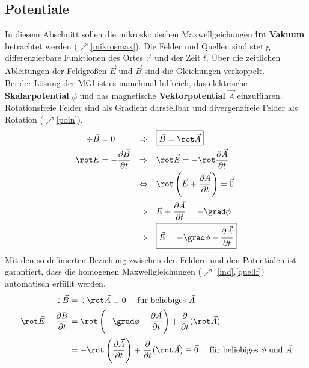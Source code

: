 \subsection{Potentiale} 
In diesem Abschnitt sollen die mikroskopischen Maxwellgeichungen \textbf{im Vakuum} betrachtet werden ($\nearrow$\ref{mikrosmax}). Die Felder und Quellen sind stetig differenzierbare Funktionen des Ortes $\vec{{r}}$ und der Zeit ${t}$. Über die zeitlichen Ableitungen der Feldgrößen $\vec{E}$ und $\vec{B}$ sind die Gleichungen verkoppelt.\\
Bei der Lösung der MGl ist es manchmal hilfreich, das elektrische \textbf{Skalarpotential} $\phi$ und das magnetische \textbf{Vektorpotential} $\vec{A}$ einzuführen. Rotationsfreie Felder sind als Gradient darstellbar und divergenzfreie Felder als Rotation ($\nearrow$\ref{poin}).
 \begin{align}
	\div \vec{B} & = 0                                     & \Rightarrow \quad    & \boxed{\vec{B} =\rot  \vec{A}}                                        \label{potadef}   \\
	\rot \vec{E} & = -\frac{\partial \vec{B} }{\partial t} & \Rightarrow  \quad   & \rot \vec{E} = -\rot \frac{\partial  \vec{A}}{\partial t}              \nonumber  \\
	&                                         & \Leftrightarrow\quad & \rot \left(\vec{E}+\frac{\partial  \vec{A}}{\partial t}\right) = \vec{0} \nonumber\\
	&                                         & \Rightarrow  \quad   & \vec{E}+\frac{\partial  \vec{A}}{\partial t} = -\grad \phi      \nonumber         \\
	&                                         & \Rightarrow \quad    & \boxed{\vec{E}=-\grad \phi -\frac{\partial  \vec{A}}{\partial t}} \label{potsdef}
\end{align}
Mit den so definierten Beziehung zwischen den Feldern und den Potentialen ist garantiert, dass die homogenen Maxwellgleichungen ($\nearrow$ \ref{ind},\ref{quellf}) automatisch erfüllt werden.
\begin{align}
	\div\vec{B} & =\div\rot \vec{{A}} \equiv 0 \quad \text { für beliebiges } \vec{{A}} \label{auterf1}\\
	\rot \vec{E}+\frac{\partial\vec{B}}{\partial {t}} & =\rot\left(-\grad \phi-\frac{\partial \vec{{A}}}{\partial {t}}\right)+\frac{\partial}{\partial {t}}(\rot \vec{{A}}) \nonumber \\
	& =-\rot\left(\frac{\partial \vec{{A}}}{\partial {t}}\right)+\frac{\partial}{\partial {t}}(\rot \vec{{A}}) \equiv \vec{0} \quad \text { für beliebiges } \phi \text { und } \vec{{A}} \label{auterf2}
\end{align}
